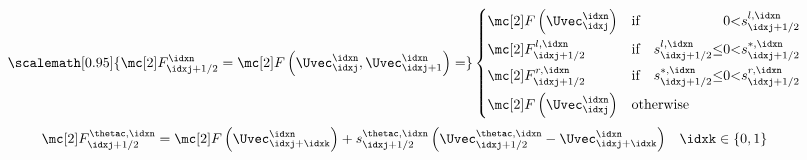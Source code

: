 \begin{defnbox}\nospacing
    \begin{defn}\label{defn:hll-3_hll-center}
        \begin{align}
          \scalemath[0.95]{\Flux_{\idxj+1/2}^{\idxn}=\Flux\left(\Uvec^{\idxn}_{\idxj},\Uvec^{\idxn}_{\idxj+1}\right)=}\left\{
                                     \begin{alignedat}{8}
                                         &\Flux\left(\Uvec_{\idxj}^{\idxn}\right)&\quad&\text{if}&\quad&&&0&<&s_{\idxj+1/2}^{l,\idxn}\\
                                         &\Flux_{\idxj+1/2}^{l,\idxn}&\quad&\text{if}&\quad&s_{\idxj+1/2}^{l,\idxn}&\leq&0&<&s_{\idxj+1/2}^{*,\idxn}\\
                                         &\Flux_{\idxj+1/2}^{r,\idxn}&\quad&\text{if}&\quad&s_{\idxj+1/2}^{*,\idxn}&\leq&0&<&s_{\idxj+1/2}^{r,\idxn}\\
                                         &\Flux\left(\Uvec_{\idxj}^{\idxn}\right)&\quad&\text{otherwise}\hspace{-8em}
                                     \end{alignedat}\right.
        \end{align}
        \begin{align*}
          \Flux_{\idxj+1/2}^{\thetac,\idxn}=\Flux\left(\Uvec_{\idxj+\idxk}^{\idxn}\right)
          +s_{\idxj+1/2}^{\thetac,\idxn}\left(\Uvec_{\idxj+1/2}^{\thetac,\idxn}-\Uvec_{\idxj+\idxk}^{\idxn}\right)&&\idxk\in\{0,1\}
        \end{align*}
        \begin{figure}[H]
            \centering{
              \def\svgwidth{200pt}
              \resizebox{\linewidth}{!}{}
            }
        \end{figure}
\end{defn}
\end{defnbox}

